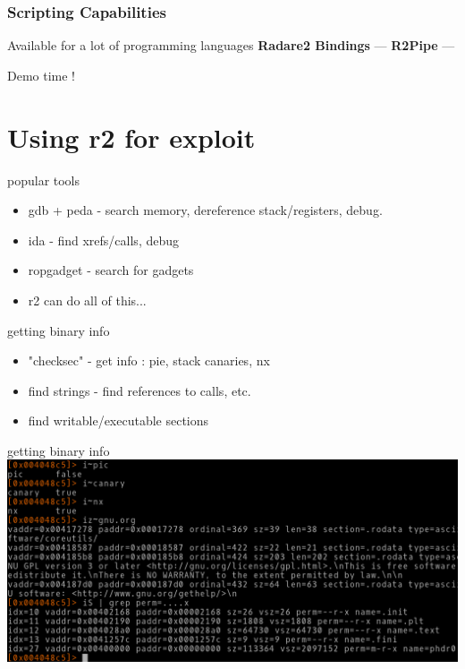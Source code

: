 \documentclass[10pt,pdf,utf8,english,compress,hyperref={unicode}]{beamer}
\begin{document}
\begin{frame}[fragile]
  \frametitle{Scripting Capabilities}
  \center Available for a lot of programming languages
  \center\textbf{Radare2 Bindings} —
  \center\textbf{R2Pipe} —
  \noindent\makebox[\linewidth]{\rule{\paperwidth}{0.4pt}}
  \item Demo time !
\end{frame}

\section{Using r2 for exploit}
\begin{frame}{popular tools}
	\begin{itemize}
		\item gdb + peda - search memory, dereference stack/registers, debug.
		\item ida - find xrefs/calls, debug
		\item ropgadget - search for gadgets
		\item r2 can do all of this...
	\end{itemize}
\end{frame}

\begin{frame}{getting binary info}
	\begin{itemize}
		\item "checksec" - get info : pie, stack canaries, nx
		\item find strings - find references to calls, etc.
		\item find writable/executable sections
	\end{itemize}
\end{frame}

\begin{frame}{getting binary info}
	\includegraphics[width=\textwidth]{crimages/bin-info.png}
\end{frame}
\end{document}
